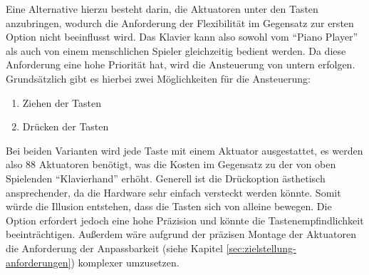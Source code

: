 Eine Alternative hierzu besteht darin, die Aktuatoren unter den Tasten anzubringen, wodurch die Anforderung der Flexibilität
im Gegensatz zur ersten Option nicht beeinflusst wird.\newline
Das Klavier kann also sowohl vom \enquote{Piano Player} als auch von einem menschlichen Spieler gleichzeitig bedient werden.
Da diese Anforderung eine hohe Priorität hat, wird die Ansteuerung von untern erfolgen. \newline
Grundsätzlich gibt es hierbei zwei Möglichkeiten für die Ansteuerung:
\begin{enumerate}
	\item Ziehen der Tasten
	\item Drücken der Tasten
\end{enumerate}
Bei beiden Varianten wird jede Taste mit einem Aktuator
ausgestattet, es werden also 88 Aktuatoren benötigt, was die Kosten %
im Gegensatz zu der von oben Spielenden \enquote{Klavierhand}
erhöht.
Generell ist die Drückoption ästhetisch ansprechender, da die Hardware sehr einfach versteckt werden könnte.
Somit würde die Illusion entstehen, dass die Tasten sich von alleine bewegen. Die Option erfordert jedoch eine hohe Präzision und könnte die
Tastenempfindlichkeit beeinträchtigen. Außerdem wäre aufgrund der präzisen Montage der Aktuatoren die Anforderung
der Anpassbarkeit (siehe Kapitel \ref{sec:zielstellung-anforderungen}) komplexer umzusetzen.

